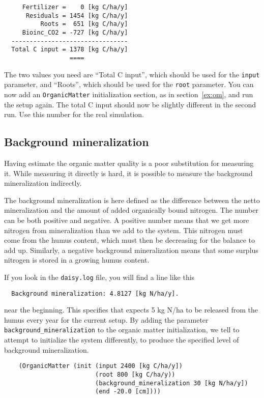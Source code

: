 \documentclass[a4paper,11pt]{article}
\begin{document}
\begin{verbatim}
     Fertilizer =    0 [kg C/ha/y]
      Residuals = 1454 [kg C/ha/y]
          Roots =  651 [kg C/ha/y]
     Bioinc_CO2 = -727 [kg C/ha/y]
  --------------------------------
  Total C input = 1378 [kg C/ha/y]
                  ====
\end{verbatim}

The two values you need are ``Total C input'', which should be used
for the \texttt{input} parameter, and ``Roots'', which should be used
for the \texttt{root} parameter.  You can now add an
\texttt{OrganicMatter} initialization section, as in
section~\ref{ex:om}, and run the setup again.  The total C input
should now be slightly different in the second run.  Use this number
for the real simulation.

\subsection{Background mineralization}
\label{sec:background}

Having \daisy{} estimate the organic matter quality is a poor
substitution for measuring it.  While measuring it directly is hard,
it is possible to measure the background mineralization indirectly. 

The background mineralization is here defined as the difference
between the netto mineralization and the amount of added organically
bound nitrogen.  The number can be both positive and negative.  A
positive number means that we get more nitrogen from mineralization
than we add to the system.  This nitrogen must come from the humus
content, which must then be decreasing for the balance to add up.
Similarly, a negative background mineralization means that some
surplus nitrogen is stored in a growing humus content.

If you look in the \texttt{daisy.log} file, you will find a line like
this
\begin{verbatim}
  Background mineralization: 4.8127 [kg N/ha/y].
\end{verbatim}
near the beginning.  This specifies that \daisy{} expects 5 kg N/ha to
be released from the humus every year for the current setup.  By
adding the parameter \texttt{background\_mineralization} to the
organic matter initialization, we tell \daisy{} to attempt to
initialize the system differently, to produce the specified level of
background mineralization.

\begin{verbatim}
    (OrganicMatter (init (input 2400 [kg C/ha/y])
                         (root 800 [kg C/ha/y))
                         (background_mineralization 30 [kg N/ha/y]) 
                         (end -20.0 [cm])))
\end{verbatim}
\end{document}
